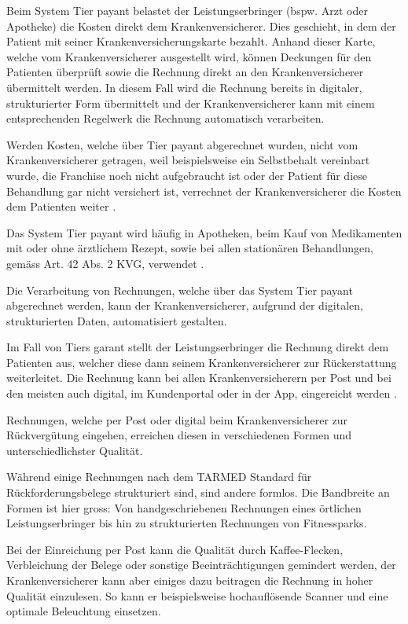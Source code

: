 \documentclass{hwz}
\begin{document}
Beim System Tier payant belastet der Leistungserbringer (bspw. Arzt oder Apotheke) die Kosten direkt dem Krankenversicherer. Dies geschieht, in dem der Patient mit seiner Kranken\-versicherungskarte bezahlt. Anhand dieser Karte, welche vom Krankenversicherer ausgestellt wird, können Deckungen für den Patienten überprüft sowie die Rechnung direkt an den Krankenversicherer übermittelt werden. In diesem Fall wird die Rechnung bereits in digitaler, strukturierter Form übermittelt und der Krankenversicherer kann mit einem entsprechenden Regelwerk die Rechnung automatisch verarbeiten. 

Werden Kosten, welche über Tier payant abgerechnet wurden, nicht vom Krankenversicherer getragen, weil beispielsweise ein Selbstbehalt vereinbart wurde, die Franchise noch nicht aufgebraucht ist oder der Patient für diese Behandlung gar nicht versichert ist, verrechnet der Krankenversicherer die Kosten dem Patienten weiter \autocite{EidgenossischesDepartementdesInnern2017FaktenblattVergutungssysteme}.

Das System Tier payant wird häufig in Apotheken, beim Kauf von Medikamenten mit oder ohne ärztlichem Rezept, sowie bei allen stationären Behandlungen, gemäss Art. 42 Abs. 2 KVG, verwendet \autocite{EidgenossischesDepartementdesInnern2017FaktenblattVergutungssysteme}.

Die Verarbeitung von Rechnungen, welche über das System Tier payant abgerechnet werden, kann der Krankenversicherer, aufgrund der digitalen, strukturierten Daten, automatisiert gestalten.

Im Fall von Tiers garant stellt der Leistungserbringer die Rechnung direkt dem Patienten aus, welcher diese dann seinem Krankenversicherer zur Rückerstattung weiterleitet. Die Rechnung kann bei allen Krankenversicherern per Post und bei den meisten auch digital, im Kundenportal oder in der App, eingereicht werden \autocite{EidgenossischesDepartementdesInnern2017FaktenblattVergutungssysteme}.

Rechnungen, welche per Post oder digital beim Krankenversicherer zur Rückvergütung eingehen, erreichen diesen in verschiedenen Formen und unterschiedlichster Qualität. 

Während einige Rechnungen nach dem TARMED Standard für Rückforderungsbelege strukturiert sind, sind andere formlos. Die Bandbreite an Formen ist hier gross: Von handgeschriebenen Rechnungen eines örtlichen Leistungserbringer bis hin zu strukturierten Rechnungen von Fitnessparks.

Bei der Einreichung per Post kann die Qualität durch Kaffee-Flecken, Verbleichung der Belege oder sonstige Beeinträchtigungen gemindert werden, der Krankenversicherer kann aber einiges dazu beitragen die Rechnung in hoher Qualität einzulesen. So kann er beispielsweise hochauflösende Scanner und eine optimale Beleuchtung einsetzen.
\end{document}
